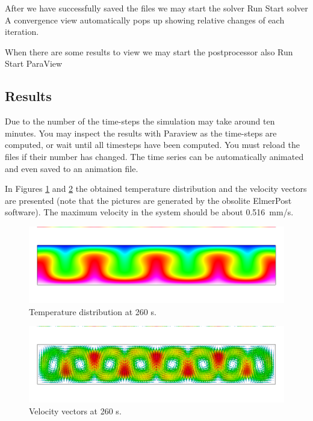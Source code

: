 After we have successfully saved the files we may start the solver
\ttbegin
Run
  Start solver
\ttend
A convergence view automatically pops up showing relative changes of each iteration.

When there are some results to view we may start the postprocessor also
\ttbegin
Run
  Start ParaView
\ttend


\subsection*{Results}

Due to the number of the time-steps the simulation may take around ten minutes.
You may inspect the results with Paraview as the time-steps are computed, or
wait until all timesteps have been computed. You must reload the files if their number has changed. 
The time series can be automatically animated and even saved to an animation file.

In Figures \ref{fg:rb_temp} and \ref{fg:rb_vel} the obtained temperature 
distribution and the velocity vectors are presented (note that the pictures are generated by the obsolite ElmerPost
software). 
The maximum velocity in the system should be about 0.516~mm/s. 

\begin{figure}[h]
\centering
\includegraphics[width=15cm, viewport=0 50 1000 250,clip]{rb_temp}
\caption{Temperature distribution at 260 s.}\label{fg:rb_temp}
\end{figure} 

\begin{figure}[h]
\centering
\includegraphics[width=15cm, viewport=0 50 1000 250,clip]{rb_velo}
\caption{Velocity vectors at 260 s.}\label{fg:rb_vel}
\end{figure} 




